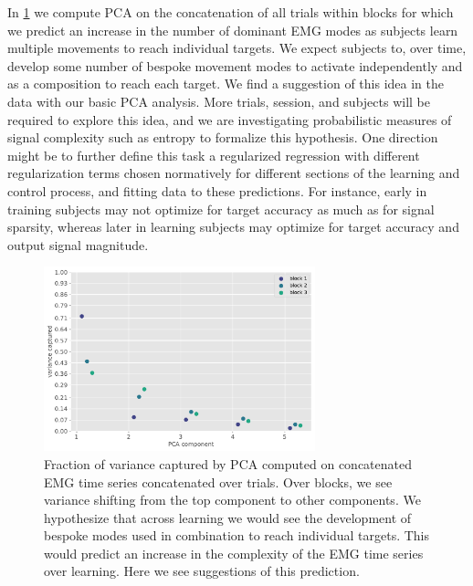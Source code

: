 \documentclass[
  a4paper,
]{article}
\begin{document}
In \cref{fig:PCA_concat_variance} we compute PCA on the concatenation of
all trials within blocks for which we predict an increase in the number
of dominant EMG modes as subjects learn multiple movements to reach
individual targets. We expect subjects to, over time, develop some
number of bespoke movement modes to activate independently and as a
composition to reach each target. We find a suggestion of this idea in
the data with our basic PCA analysis. More trials, session, and subjects
will be required to explore this idea, and we are investigating
probabilistic measures of signal complexity such as entropy to formalize
this hypothesis. One direction might be to further define this task a
regularized regression with different regularization terms chosen
normatively for different sections of the learning and control process,
and fitting data to these predictions. For instance, early in training
subjects may not optimize for target accuracy as much as for signal
sparsity, whereas later in learning subjects may optimize for target
accuracy and output signal magnitude.

\begin{figure}
\hypertarget{fig:PCA_concat_variance}{%
\centering
\includegraphics[width=0.7\textwidth,height=\textheight]{images/data_analysis/center_hold/PCA_concat_variance.pdf}
\caption{Fraction of variance captured by PCA computed on concatenated
EMG time series concatenated over trials. Over blocks, we see variance
shifting from the top component to other components. We hypothesize that
across learning we would see the development of bespoke modes used in
combination to reach individual targets. This would predict an increase
in the complexity of the EMG time series over learning. Here we see
suggestions of this prediction.}\label{fig:PCA_concat_variance}
}
\end{figure}

\clearpage
\end{document}
